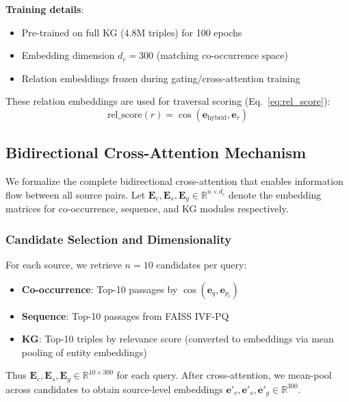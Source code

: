\documentclass[10pt,twocolumn]{article}
\begin{document}
\textbf{Training details}:
\begin{itemize}
    \item Pre-trained on full KG (4.8M triples) for 100 epochs
    \item Embedding dimension $d_c=300$ (matching co-occurrence space)
    \item Relation embeddings frozen during gating/cross-attention training
\end{itemize}

These relation embeddings are used for traversal scoring (Eq.~\ref{eq:rel_score}):
\begin{equation}
\text{rel\_score}(r) = \cos(\mathbf{e}_{\text{hybrid}}, \mathbf{e}_r)
\label{eq:rel_score}
\end{equation}



\subsection{Bidirectional Cross-Attention Mechanism}
\label{sec:bidirectional}

We formalize the complete bidirectional cross-attention that enables information flow between all source pairs. Let $\mathbf{E}_c, \mathbf{E}_s, \mathbf{E}_g \in \mathbb{R}^{n \times d_c}$ denote the embedding matrices for co-occurrence, sequence, and KG modules respectively.

\subsubsection{Candidate Selection and Dimensionality}
\label{sec:candidate_selection}

For each source, we retrieve $n=10$ candidates per query:

\begin{itemize}
    \item \textbf{Co-occurrence}: Top-10 passages by $\cos(\mathbf{e}_q, \mathbf{e}_{p_i})$
    \item \textbf{Sequence}: Top-10 passages from FAISS IVF-PQ
    \item \textbf{KG}: Top-10 triples by relevance score (converted to embeddings via mean pooling of entity embeddings)
\end{itemize}

Thus $\mathbf{E}_c, \mathbf{E}_s, \mathbf{E}_g \in \mathbb{R}^{10 \times 300}$ for each query. After cross-attention, we mean-pool across candidates to obtain source-level embeddings $\mathbf{e}'_c, \mathbf{e}'_s, \mathbf{e}'_g \in \mathbb{R}^{300}$.
\end{document}
